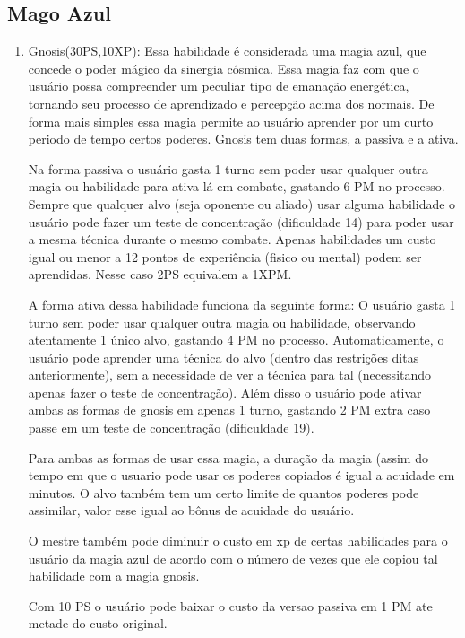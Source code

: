 \subsection{Mago Azul} 
 
 		
\begin{enumerate}

	\item Gnosis(30PS,10XP): Essa habilidade é considerada uma magia azul, que concede o poder mágico da sinergia cósmica. Essa magia faz com que o usuário possa compreender um peculiar tipo de emanação energética, tornando seu processo de aprendizado e percepção acima dos normais. De forma mais simples essa magia permite ao usuário aprender por um curto periodo de tempo certos poderes. Gnosis tem duas formas, a passiva e a ativa. 
	
	Na forma passiva o usuário gasta 1 turno sem poder usar qualquer outra magia ou habilidade para ativa-lá em combate, gastando 6 PM no processo. Sempre que qualquer alvo (seja oponente ou aliado) usar alguma habilidade o usuário pode fazer um teste de concentração (dificuldade 14) para poder usar a mesma técnica durante o mesmo combate. Apenas habilidades um custo igual ou menor a 12 pontos de experiência (fisico ou mental) podem ser aprendidas. Nesse caso 2PS equivalem a 1XPM.
	
    A forma ativa dessa habilidade funciona da seguinte forma: O usuário gasta 1 turno sem poder usar qualquer outra magia ou habilidade, observando atentamente 1 único alvo, gastando 4 PM no processo. Automaticamente, o usuário pode aprender uma técnica do alvo (dentro das restrições ditas anteriormente), sem a necessidade de ver a técnica para tal (necessitando apenas fazer o teste de concentração). Além disso o usuário pode ativar ambas as formas de gnosis em apenas 1 turno, gastando 2 PM extra caso passe em um teste de concentração (dificuldade 19). 
    
    Para ambas as formas de usar essa magia, a duração da magia (assim do tempo em que o usuario pode usar os poderes copiados é igual a acuidade em minutos. O alvo também tem um certo limite de quantos poderes pode assimilar, valor esse igual ao bônus de acuidade do usuário. 
    
    O mestre também pode diminuir o custo em xp de certas habilidades para o usuário da magia azul de acordo com o número de vezes que ele copiou tal habilidade com a magia gnosis. 
    
    Com 10 PS o usuário pode baixar o custo da versao passiva em 1 PM ate metade do custo original. 


\end{enumerate}
